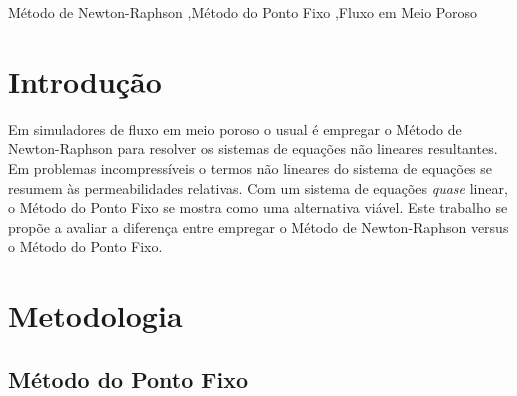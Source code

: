 \documentclass[final,5p]{elsarticle}
\numberwithin{equation}{section}
\begin{document}
\begin{frontmatter}
\begin{abstract}
\end{abstract}




\begin{keyword}
    Método de Newton-Raphson \sep Método do Ponto Fixo \sep Fluxo em Meio Poroso



\end{keyword}

\end{frontmatter}


\section{Introdução}

        Em simuladores de fluxo em meio poroso o usual é empregar o Método de Newton-Raphson para resolver os sistemas de equações não lineares resultantes\cite{computer2022cmg}\cite{schlumberger2009technical}. Em problemas incompressíveis o termos não lineares do sistema de equações se resumem às permeabilidades relativas. Com um sistema de equações \emph{quase} linear, o Método do Ponto Fixo se mostra como uma alternativa viável. Este trabalho se propõe a avaliar a diferença entre empregar o Método de Newton-Raphson versus o Método do Ponto Fixo.

\section{Metodologia}

    \subsection{Método do Ponto Fixo}
\end{document}
